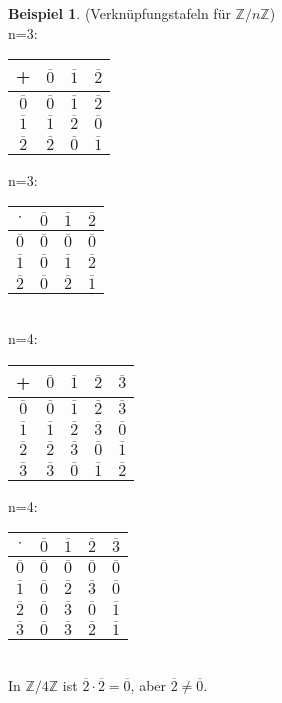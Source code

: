 \documentclass[10pt,a4paper,numbers=endperiod]{scrartcl}
\theoremstyle{definition}
\newtheorem{bsp}[satz]{Beispiel}
\begin{document}
\begin{bsp}
	(Verknüpfungstafeln für $\mathbb{Z}/n\mathbb{Z}$)\\
	n=3: \begin{tabular}{c|ccc}
		+& $\overline{0}$&$\overline{1}$&$\overline{2}$\\
		\hline
		$\overline{0}$&$\overline{0}$&$\overline{1}$&$\overline{2}$\\
		$\overline{1}$&$\overline{1}$&$\overline{2}$&$\overline{0}$\\
		$\overline{2}$&$\overline{2}$&$\overline{0}$&$\overline{1}$\\
	\end{tabular}
	n=3: \begin{tabular}{c|ccc}
		$\cdot$& $\overline{0}$&$\overline{1}$&$\overline{2}$\\
		\hline
		$\overline{0}$&$\overline{0}$&$\overline{0}$&$\overline{0}$\\
		$\overline{1}$&$\overline{0}$&$\overline{1}$&$\overline{2}$\\
		$\overline{2}$&$\overline{0}$&$\overline{2}$&$\overline{1}$\\
		
	\end{tabular}\\
	n=4: \begin{tabular}{c|cccc}
			+& $\overline{0}$&$\overline{1}$&$\overline{2}$&$\overline{3}$\\
		\hline
		$\overline{0}$&$\overline{0}$&$\overline{1}$&$\overline{2}$&$\overline{3}$\\
		$\overline{1}$&$\overline{1}$&$\overline{2}$&$\overline{3}$&$\overline{0}$\\
		$\overline{2}$&$\overline{2}$&$\overline{3}$&$\overline{0}$&$\overline{1}$\\
		$\overline{3}$&$\overline{3}$&$\overline{0}$&$\overline{1}$&$\overline{2}$\\
				
		 \end{tabular}
	 n=4: \begin{tabular}{c|cccc}
	 	$\cdot$& $\overline{0}$&$\overline{1}$&$\overline{2}$&$\overline{3}$\\
	 	\hline
	 	$\overline{0}$&$\overline{0}$&$\overline{0}$&$\overline{0}$&$\overline{0}$\\
	 	$\overline{1}$&$\overline{0}$&$\overline{2}$&$\overline{3}$&$\overline{0}$\\
	 	$\overline{2}$&$\overline{0}$&$\overline{3}$&$\overline{0}$&$\overline{1}$\\
	 	$\overline{3}$&$\overline{0}$&$\overline{3}$&$\overline{2}$&$\overline{1}$\\
	 \end{tabular}\\
 In $\mathbb{Z}/4\mathbb{Z}$ ist $\overline{2} \cdot \overline{2}= \overline{0}$, aber $\overline{2} \neq \overline{0}$.
\end{bsp}
\end{document}
